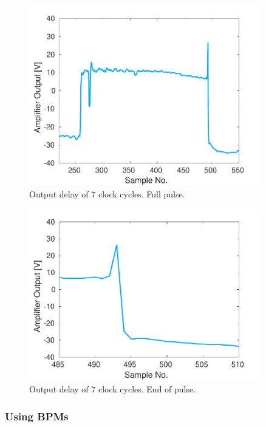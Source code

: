\begin{figure}
  \centering
  \includegraphics[width=0.9\textwidth]{Figures/commissioning/absDelay7_all}
  \caption{Output delay of 7 clock cycles. Full pulse.}
  \label{f:absDelay7_all}
\end{figure}

\begin{figure}
  \centering
  \includegraphics[width=0.9\textwidth]{Figures/commissioning/absDelay7_end}
  \caption{Output delay of 7 clock cycles. End of pulse.}
  \label{f:absDelay7_end}
\end{figure}


\subsubsection{Using BPMs}
\label{sss:relativeBPM}

